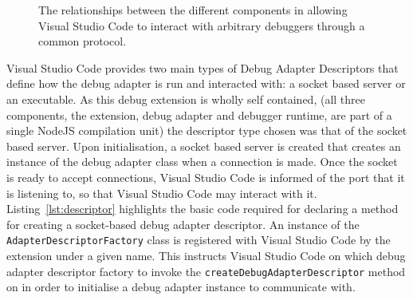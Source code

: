 \documentclass[12pt,pdftex,titlepage]{report}
\begin{document}
            \begin{figure}[hbt!]
                \centering
                \caption[Diagram of components in a Visual Studio Code debug extension]{The relationships between the different components in allowing Visual Studio Code to interact with arbitrary debuggers through a common protocol.}
                \label{fig:vscodedebug}
            \end{figure}

            Visual Studio Code provides two main types of Debug Adapter Descriptors that define how the debug adapter is run and interacted with: a socket based server or an executable. As this debug extension is wholly self contained, 
            (all three components, the extension, debug adapter and debugger runtime, are part of a single NodeJS compilation unit) the descriptor type chosen was that of the socket based server. Upon initialisation, a socket based server is 
            created that creates an instance of the debug adapter class when a connection is made. Once the socket is ready to accept connections, Visual Studio Code is informed of the port that it is listening to, so that Visual Studio 
            Code may interact with it. Listing~\ref{lst:descriptor} highlights the basic code required for declaring a method for creating a socket-based debug adapter descriptor. An instance of the \texttt{AdapterDescriptorFactory} class 
            is registered with Visual Studio Code by the extension under a given name. This instructs Visual Studio Code on which debug adapter descriptor factory to invoke the \texttt{createDebugAdapterDescriptor} method on in order to 
            initialise a debug adapter instance to communicate with.
\end{document}
